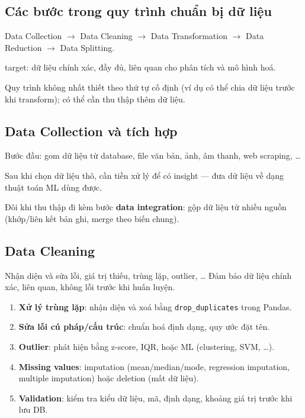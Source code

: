 \subsection{Các bước trong quy trình chuẩn bị dữ liệu}

\begin{phuongphap}[title={Chuỗi bước target}]
Data Collection $\rightarrow$ Data Cleaning $\rightarrow$ Data Transformation $\rightarrow$ Data Reduction $\rightarrow$ Data Splitting.

target: dữ liệu chính xác, đầy đủ, liên quan cho phân tích và mô hình hoá.
\end{phuongphap}

\begin{luuy}[title={Không luôn tuần tự}]
Quy trình không nhất thiết theo thứ tự cố định (ví dụ có thể chia dữ liệu trước khi transform); có thể cần thu thập thêm dữ liệu.
\end{luuy}

\subsection{Data Collection và tích hợp}

\begin{ynghia}[title={Thu thập dữ liệu}]
Bước đầu: gom dữ liệu từ database, file văn bản, ảnh, âm thanh, web scraping, \ldots

Sau khi chọn dữ liệu thô, cần tiền xử lý để có insight --- đưa dữ liệu về dạng thuật toán ML dùng được.

Đôi khi thu thập đi kèm bước \textbf{data integration}: gộp dữ liệu từ nhiều nguồn (khớp/liên kết bản ghi, merge theo biến chung).
\end{ynghia}

\subsection{Data Cleaning}

\begin{dinhnghia}[title={Data cleaning}]
Nhận diện và sửa lỗi, giá trị thiếu, trùng lặp, outlier, \ldots
Đảm bảo dữ liệu chính xác, liên quan, không lỗi trước khi huấn luyện.
\end{dinhnghia}

\begin{phuongphap}[title={Các bước làm sạch}]
\begin{enumerate}
  \item \textbf{Xử lý trùng lặp}: nhận diện và xoá bằng \texttt{drop\_duplicates} trong Pandas.
  \item \textbf{Sửa lỗi cú pháp/cấu trúc}: chuẩn hoá định dạng, quy ước đặt tên.
  \item \textbf{Outlier}: phát hiện bằng z-score, IQR, hoặc ML (clustering, SVM, \ldots).
  \item \textbf{Missing values}: imputation (mean/median/mode, regression imputation, multiple imputation) hoặc deletion (mất dữ liệu).
  \item \textbf{Validation}: kiểm tra kiểu dữ liệu, mã, định dạng, khoảng giá trị trước khi lưu DB.
\end{enumerate}
\end{phuongphap}

